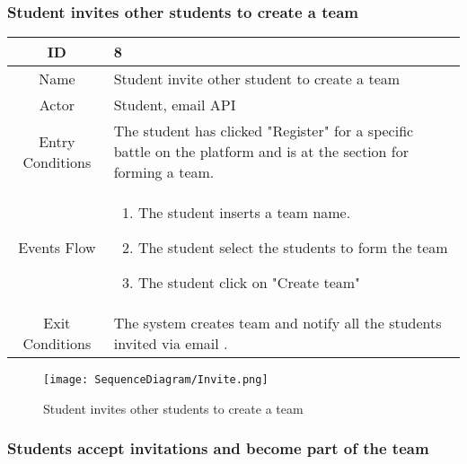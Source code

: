 \subsubsection{Student invites other students to create a team}
\begin{longtable}{|c| p{10cm}|}
        \hline
            ID & 8 \\
        \hline
            Name & Student invite other student to create a team  \\
        \hline
            Actor & Student, email API \\
        \hline
            Entry Conditions & 

                                 The student has clicked "Register" for a specific battle on the platform and is at the section for  forming a team.
\\
        \hline
            Events Flow &   \begin{enumerate}
            
                                \item The student inserts a team name.
                                \item The student select the students  to form the team 
                                \item  The student click on "Create team"
                                
                            \end{enumerate} \\
        \hline
            Exit Conditions &
            The system creates team and notify all the students invited via email . 
\\
        \hline
    \end{longtable}

\begin{figure}[H]
  \texttt{[image: SequenceDiagram/Invite.png]} 
  \caption{Student invites other students to create a team}
  \label{fig:immagine}
\end{figure}


\subsubsection{Students accept invitations and become part of the team}

